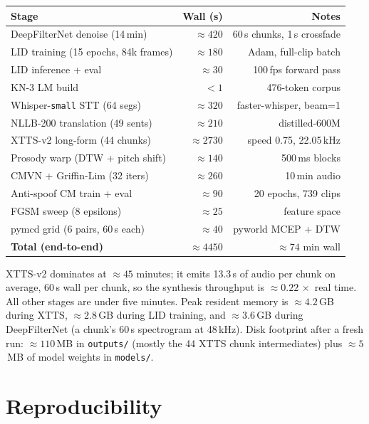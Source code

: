 \documentclass[conference]{IEEEtran}
\begin{document}
\begin{center}
\scriptsize
\setlength{\tabcolsep}{4pt}
\begin{tabular}{@{}l r r@{}}
\toprule
\textbf{Stage} & \textbf{Wall (s)} & \textbf{Notes} \\
\midrule
DeepFilterNet denoise (14\,min) & $\approx 420$ & 60\,s chunks, 1\,s crossfade \\
LID training (15 epochs, 84k frames) & $\approx 180$ & Adam, full-clip batch \\
LID inference + eval                & $\approx 30$ & 100\,fps forward pass \\
KN-3 LM build                       & $<1$ & 476-token corpus \\
Whisper-\texttt{small} STT (64 segs) & $\approx 320$ & faster-whisper, beam=1 \\
NLLB-200 translation (49 sents)     & $\approx 210$ & distilled-600M \\
XTTS-v2 long-form (44 chunks)       & $\approx 2730$ & speed 0.75, 22.05\,kHz \\
Prosody warp (DTW + pitch shift)    & $\approx 140$ & 500\,ms blocks \\
CMVN + Griffin-Lim (32 iters)       & $\approx 260$ & 10\,min audio \\
Anti-spoof CM train + eval          & $\approx 90$ & 20 epochs, 739 clips \\
FGSM sweep (8 epsilons)             & $\approx 25$ & feature space \\
pymcd grid (6 pairs, 60\,s each)    & $\approx 40$ & pyworld MCEP + DTW \\
\midrule
\textbf{Total (end-to-end)}         & $\approx 4450$ & $\approx 74$ min wall \\
\bottomrule
\end{tabular}
\end{center}

\noindent XTTS-v2 dominates at $\approx 45$ minutes; it emits 13.3\,s of
audio per chunk on average, 60\,s wall per chunk, so the synthesis
throughput is $\approx 0.22\,\times$ real time. All other stages are
under five minutes. Peak resident memory is $\approx 4.2$\,GB during
XTTS, $\approx 2.8$\,GB during LID training, and $\approx 3.6$\,GB
during DeepFilterNet (a chunk's 60\,s spectrogram at 48\,kHz).
Disk footprint after a fresh run: $\approx 110$\,MB in \texttt{outputs/}
(mostly the 44 XTTS chunk intermediates) plus $\approx 5$\,MB of model
weights in \texttt{models/}.

\section{Reproducibility}
\end{document}
